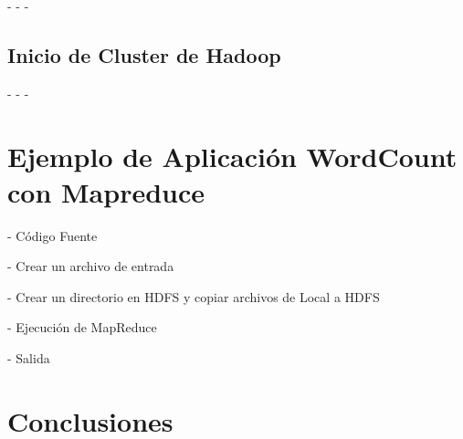 -
-
-

\subsection{Inicio de Cluster de Hadoop}
\lipsum[2-4]

-
-
-





\section{Ejemplo de Aplicación WordCount con Mapreduce}
\lipsum[2-4]

- Código Fuente

- Crear un archivo de entrada


- Crear un directorio en HDFS y copiar archivos de Local a HDFS


- Ejecución de MapReduce

- Salida



\section{Conclusiones}
\lipsum[2-2]
\clearpage
 